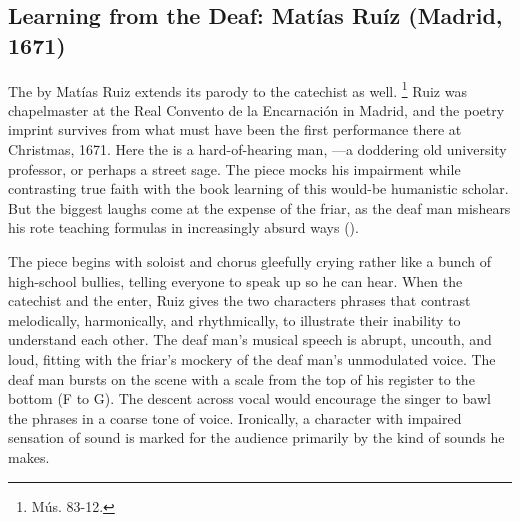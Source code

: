 \subsection{Learning from the Deaf: Matías Ruíz (Madrid, 1671)}

The  by Matías Ruiz extends its parody to 
the catechist as well.%
\footnote{\signature{E-E}{Mús. 83-12}.}
Ruiz was chapelmaster at the Real Convento de la Encarnación in Madrid, and the 
poetry imprint survives from what must have been the first performance there at 
Christmas, 1671.%
\autocite{1671-Madrid-Enc-Nav}
Here the  is a hard-of-hearing man, ---a doddering old university professor, or perhaps a street sage.
The piece mocks his impairment while contrasting true faith with the book 
learning of this would-be humanistic scholar.
But the biggest laughs come at the expense of the friar, as the deaf man 
mishears his rote teaching formulas in increasingly absurd ways 
().


The piece begins with soloist and chorus gleefully crying   rather like a bunch of high-school bullies, telling everyone to 
speak up so he can hear.
When the catechist and the  enter, Ruiz gives the two characters 
phrases that contrast melodically, harmonically, and rhythmically, to 
illustrate their inability to understand each other.
The deaf man's musical speech is abrupt, uncouth, and loud, fitting with the 
friar's mockery of the deaf man's unmodulated voice.
The deaf man bursts on the scene with a scale from the top of his register to 
the bottom (F to G).
The descent across vocal  would encourage the singer to bawl 
the phrases in a coarse tone of voice.
Ironically, a character with impaired sensation of sound is marked for the
audience primarily by the kind of sounds he makes. 


